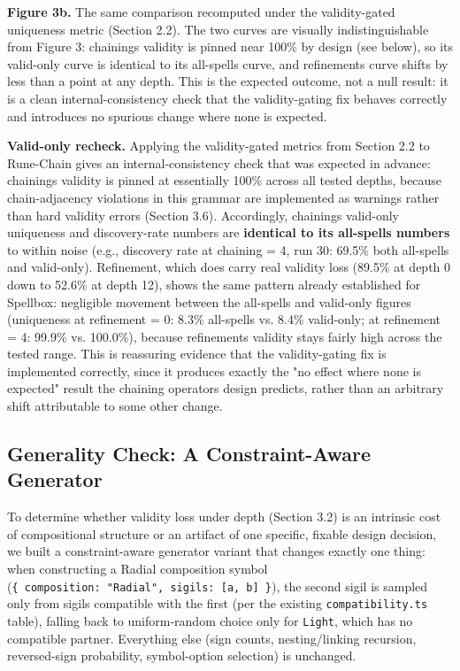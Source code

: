 \documentclass[
  10pt,
  twocolumn]{article}
\newcounter{none} %
\begin{document}
\textbf{Figure 3b.} The same comparison recomputed under the
validity-gated uniqueness metric (Section 2.2). The two curves are
visually indistinguishable from Figure 3: chaining\textquotesingle s
validity is pinned near 100\% by design (see below), so its valid-only
curve is identical to its all-spells curve, and
refinement\textquotesingle s curve shifts by less than a point at any
depth. This is the expected outcome, not a null result: it is a clean
internal-consistency check that the validity-gating fix behaves
correctly and introduces no spurious change where none is expected.

\textbf{Valid-only recheck.} Applying the validity-gated metrics from
Section 2.2 to Rune-Chain gives an internal-consistency check that was
expected in advance: chaining\textquotesingle s validity is pinned at
essentially 100\% across all tested depths, because chain-adjacency
violations in this grammar are implemented as warnings rather than hard
validity errors (Section 3.6). Accordingly, chaining\textquotesingle s
valid-only uniqueness and discovery-rate numbers are \textbf{identical
to its all-spells numbers} to within noise (e.g., discovery rate at
chaining = 4, run 30: 69.5\% both all-spells and valid-only).
Refinement, which does carry real validity loss (89.5\% at depth 0 down
to 52.6\% at depth 12), shows the same pattern already established for
Spellbox: negligible movement between the all-spells and valid-only
figures (uniqueness at refinement = 0: 8.3\% all-spells vs. 8.4\%
valid-only; at refinement = 4: 99.9\% vs. 100.0\%), because
refinement\textquotesingle s validity stays fairly high across the
tested range. This is reassuring evidence that the validity-gating fix
is implemented correctly, since it produces exactly the "no effect where
none is expected" result the chaining operator\textquotesingle s design
predicts, rather than an arbitrary shift attributable to some other
change.

\subsection{Generality Check: A Constraint-Aware
Generator}\label{generality-check-a-constraint-aware-generator}

To determine whether validity loss under depth (Section 3.2) is an
intrinsic cost of compositional structure or an artifact of one
specific, fixable design decision, we built a constraint-aware generator
variant that changes exactly one thing: when constructing a Radial
composition symbol
(\texttt{\{\ composition:\ "Radial",\ sigils:\ {[}a,\ b{]}\ \}}), the
second sigil is sampled only from sigils compatible with the first (per
the existing \texttt{compatibility.ts} table), falling back to
uniform-random choice only for \texttt{Light}, which has no compatible
partner. Everything else (sign counts, nesting/linking recursion,
reversed-sign probability, symbol-option selection) is unchanged.
\end{document}
